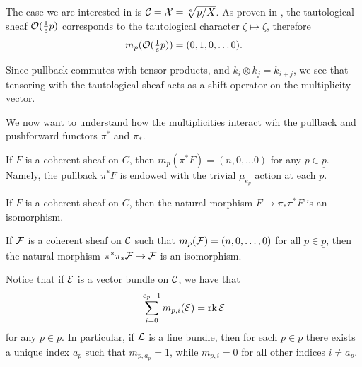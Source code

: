 
The case we are interested in is $\mathcal{C} = \mathcal{X} = \sqrt[e]{p / X} $. As proven in , the tautological sheaf $\mathcal{O}(\frac{1}{e} p)$ corresponds to the tautological character $\zeta \mapsto \zeta$, therefore
\[
m_p(\mathcal{O}(\tfrac{1}{e}p)) = (0, 1, 0, \dots 0).
\]

Since pullback commutes with tensor products, and $k_i \otimes k_j = k_{i+j}$, we see that tensoring with the tautological sheaf acts as a shift operator on the multiplicity vector.

We now want to understand how the multiplicities interact wih the pullback and pushforward functors $\pi^*$ and $\pi_*$.

\begin{prop}\cite[Example 1.2.9]{Taams} \label{multiplicity of pullback}
If $F$ is a coherent sheaf on $C$, then $m_p(\pi^* F) = (n, 0, \dots 0)$ for any $p \in \underline{p}$. Namely, the pullback $\pi^* F$ is endowed with the trivial $\mu_{e_p}$ action at each $p$.
\end{prop}

\begin{prop}\cite[Corollary 1.2.6]{Taams} \label{pi_*pi^* isom}
If $F$ is a coherent sheaf on $C$, then the natural morphism $F \to \pi_*\pi^* F$ is an isomorphism.
\end{prop}

\begin{prop}\cite[Theorem 1.2.10]{Taams} \label{pi^*pi_* isom}
If $\mathcal{F}$ is a coherent sheaf on $\mathcal{C}$ such that $m_p(\mathcal{F}) = (n, 0, \dots , 0)$ for all $p \in \underline{p}$, then the natural morphism $\pi^* \pi_* \mathcal{F} \to \mathcal{F}$ is an isomorphism.
\end{prop}

Notice that if $\mathcal{E}$ is a vector bundle on $\mathcal{C}$, we have that
\begin{equation} \label{eq: rank = sum of multiplicities}
\sum_{i = 0}^{e_p -1} m_{p,i}(\mathcal{E}) = \operatorname{rk} \mathcal{E}
\end{equation}
for any $p \in \underline{p}$. In particular, if $\mathcal{L}$ is a line bundle, then for each $p \in \underline{p}$ there exists a unique index $a_p$ such that $m_{p, a_p} =1$, while $m_{p,i} = 0$ for all other indices $i \neq a_p$.

